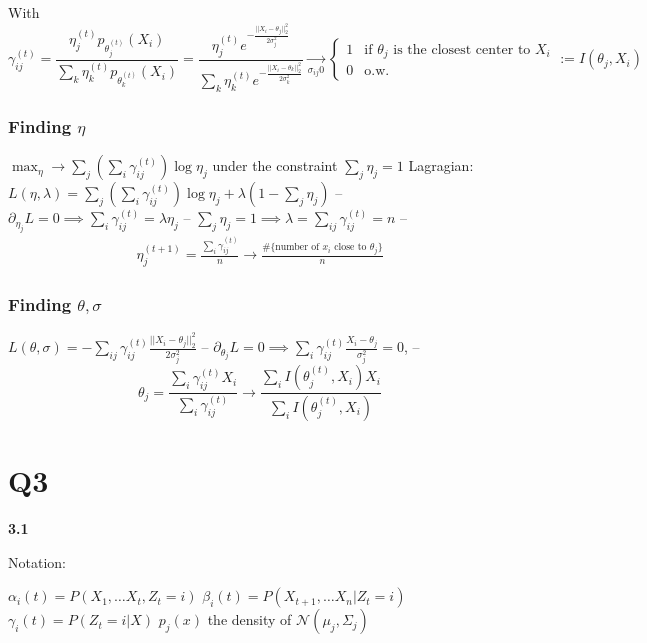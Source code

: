 \documentclass[11pt]{article}
\begin{document}
With
\[\gamma_{ij}^{(t)} = \frac{\eta_j^{(t)} p_{\theta^{(t)}_j}(X_i)}{\sum_k \eta_k^{(t)} p_{\theta^{(t)}_k}(X_i)} = \frac{\eta_j^{(t)} e^{- \frac{||X_i - \theta_j||_2^2}{2\sigma_j^2}}}{\sum_k \eta_k^{(t)} e^{- \frac{||X_i - \theta_k||_2^2}{2\sigma_k^2}}}
\underset{\sigma_{ij} 0}{\longrightarrow} \left\{\begin{array}{cc}
1 & \text{if $\theta_j$ is the closest center to $X_i$}\\
0 & \text{o.w.}
\end{array}
\right. := I(\theta_j, X_i)
\]



\subsubsection{Finding \(\eta\)}
\label{sec:orgheadline2}
\(\max_\eta \rightarrow \sum_{j}  (\sum_i \gamma_{ij}^{(t)}) \log \eta_j\) under the constraint \(\sum_j \eta_j = 1\)
Lagragian: \(L(\eta, \lambda) = \sum_{j}  (\sum_i \gamma_{ij}^{(t)}) \log \eta_j + \lambda(1- \sum_j \eta_j)\)
-- \(\partial_{\eta_j} L = 0 \implies \sum_i \gamma_{ij}^{(t)} = \lambda \eta_j\)
-- \(\sum_j \eta_j = 1 \implies \lambda = \sum_{ij}\gamma_{ij}^{(t)} = n\) 
--
\begin{align*}
\eta_j^{(t+1)} = \frac{\sum_i \gamma_{ij}^{(t)}}n \rightarrow \frac{\#\{\text{number of $x_i$ close to $\theta_j$}\}}{n}
\end{align*}

\subsubsection{Finding \(\theta, \sigma\)}
\label{sec:orgheadline3}
\(L(\theta, \sigma) = - \sum_{ij} \gamma_{ij}^{(t)} \frac{||X_i - \theta_j||_2^2}{2\sigma_j^2}\)
-- \(\partial_{\theta_j} L = 0 \implies \sum_i \gamma_{ij}^{(t)} \frac{X_i - \theta_j}{\sigma_j^2} = 0\),
-- $$\theta_j = \frac{\sum_i \gamma_{ij}^{(t)} X_i}{\sum_i \gamma_{ij}^{(t)}} \rightarrow \frac{\sum_i I(\theta_j^{(t)}, X_i) X_i}{\sum_i I(\theta_j^{(t)}, X_i)} $$


\section{Q3}
\label{sec:orgheadline5}

\textbf{3.1}

Notation:

\(\alpha_i(t) = P(X_1, \ldots X_t, Z_t = i)\)
\(\beta_i(t) = P(X_{t+1}, \ldots X_n | Z_t = i)\)
\(\gamma_i(t) = P(Z_t = i | X)\)
\(p_j(x)\)  the density of \(\mathcal N(\mu_j, \Sigma_j)\)
\end{document}
